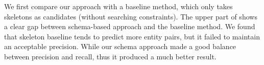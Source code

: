 %

We first compare our approach with a baseline method,
which only takes skeletons as candidates (without searching constraints).
The upper part of  shows a clear gap
between schema-based approach and the baseline method. 
We found that skeleton baseline tends to predict more entity pairs,
but it failed to maintain an acceptable precision.
While our schema approach made a good balance between precision and recall,
thus it produced a much better result.




